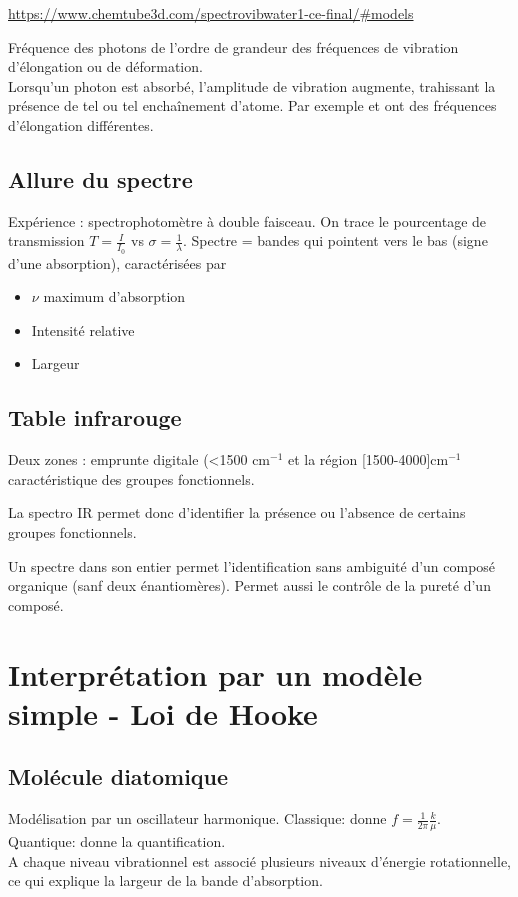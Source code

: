\documentclass[11pt]{report}
\numberwithin{figure}{section}
\numberwithin{equation}{section}
\numberwithin{table}{section}
\newcommand{\1}{\boldsymbol{1}}
\begin{document}
\url{https://www.chemtube3d.com/spectrovibwater1-ce-final/#models}

Fréquence des photons de l'ordre de grandeur des fréquences de vibration d'élongation ou de déformation. \\
Lorsqu'un photon est absorbé, l'amplitude de vibration augmente, trahissant la présence de tel ou tel enchaînement d'atome. Par exemple  et  ont des fréquences d'élongation différentes.

\subsection{Allure du spectre}

Expérience : spectrophotomètre à double faisceau. On trace le pourcentage de transmission $T = \frac{I}{I_0}$ vs $\sigma = \frac{1}{\lambda}$. Spectre = bandes qui pointent vers le bas (signe d'une absorption), caractérisées par
\begin{itemize}
\item $\nu$ maximum d'absorption
\item Intensité relative
\item Largeur
\end{itemize}

\subsection{Table infrarouge}

Deux zones : emprunte digitale (<1500 cm$^{-1}$ et la région [1500-4000]cm$^{-1}$ caractéristique des groupes fonctionnels.

La spectro IR permet donc d'identifier la présence ou l'absence de certains groupes fonctionnels.

Un spectre dans son entier permet l'identification sans ambiguité d'un composé organique (sanf deux énantiomères). Permet aussi le contrôle de la pureté d'un composé.

\section{Interprétation par un modèle simple - Loi de Hooke}

\subsection{Molécule diatomique}

Modélisation par un oscillateur harmonique. Classique: donne $f = \frac{1}{2\pi} \frac{k}{\mu}$. Quantique: donne la quantification. \\
A chaque niveau vibrationnel est associé plusieurs niveaux d'énergie rotationnelle, ce qui explique la largeur de la bande d'absorption.
\end{document}
